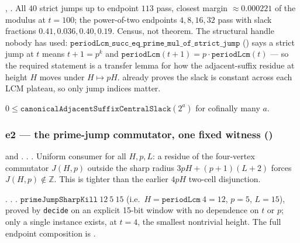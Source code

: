 \begin{rem}
, . All $40$ strict jumps up to endpoint $113$ pass, closest margin
$\approx 0.000221$ of the modulus at $t=100$; the power-of-two endpoints $4,8,16,32$ pass with
slack fractions $0.41,0.036,0.40,0.19$. Census, not theorem. The structural handle nobody has used:
$\mathtt{periodLcm\_succ\_eq\_prime\_mul\_of\_strict\_jump}$
() says a
strict jump at $t$ means $t{+}1=p^k$ and $\mathtt{periodLcm}(t{+}1) = p\cdot\mathtt{periodLcm}(t)$
--- so the required statement is a transfer lemma for how the adjacent-suffix residue at height $H$
moves under $H\mapsto pH$.
already proves the slack is constant across each LCM plateau, so only jump indices matter.
\end{rem}

\begin{prop}
$0\le \mathtt{canonicalAdjacentSuffixCentralSlack}(2^a)$ for cofinally many $a$.
\end{prop}

\subsubsection{e2 --- the prime-jump commutator, one fixed witness ()}

\begin{thm}
 and
. .
. Uniform consumer for all $H,p,L$: a residue of the four-vertex commutator
$J(H,p)$ outside the sharp radius $3pH{+}(p{+}1)(L{+}2)$ forces $J(H,p)\notin\mathbb Z$. This is
tighter than the earlier $4pH$ two-cell disjunction.
\end{thm}

\begin{thm}
. . .
$\mathtt{primeJumpSharpKill}\ 12\ 5\ 15$ (i.e.\ $H=\mathtt{periodLcm}\ 4=12$, $p=5$, $L=15$),
proved by \texttt{decide} on an explicit 15-bit window with no dependence on $t$ or $p$; only a
single instance exists, at $t=4$, the smallest nontrivial height. The full endpoint composition is
.
\end{thm}


